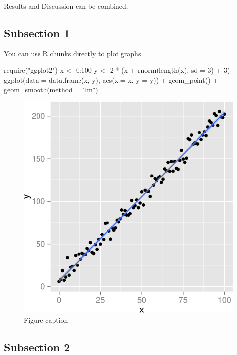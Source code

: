 \documentclass[10pt]{article}
\newenvironment{CodeChunk}{}{}
\begin{document}
Results and Discussion can be combined.

\subsection*{Subsection 1}\label{subsection-1}

You can use R chunks directly to plot graphs.

\begin{CodeChunk}
\begin{CodeInput}
require("ggplot2")
x <- 0:100
y <- 2 * (x + rnorm(length(x), sd = 3) + 3)
ggplot(data = data.frame(x, y),
       aes(x = x, y = y)) +
  geom_point() +
  geom_smooth(method = "lm")
\end{CodeInput}
\begin{figure}

{\centering \includegraphics{skeleton_files/figure-latex/graph-1}

}

\caption[Figure caption]{Figure caption}\label{fig:graph}
\end{figure}
\end{CodeChunk}

\subsection*{Subsection 2}\label{subsection-2}
\end{document}
